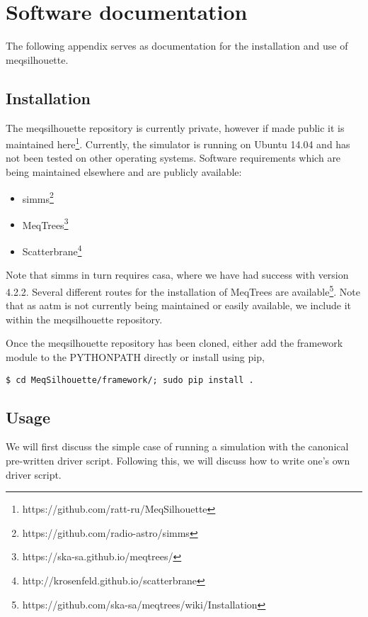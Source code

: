\chapter{Software documentation}
The following appendix serves as documentation for the installation and use of {\sc meqsilhouette}.

\section{Installation}

The {\sc meqsilhouette} repository is currently private, however if made public it is maintained here\footnote{https://github.com/ratt-ru/MeqSilhouette}. Currently, the simulator is running on {\sc Ubuntu 14.04} and has not been tested on other operating systems. Software requirements which are being maintained elsewhere and are publicly available: 
\begin{itemize}
 \item {\sc simms}\footnote{https://github.com/radio-astro/simms}
 \item {\sc MeqTrees}\footnote{https://ska-sa.github.io/meqtrees/} 
 \item {\sc Scatterbrane}\footnote{http://krosenfeld.github.io/scatterbrane}
\end{itemize}

Note that {\sc simms} in turn requires {\sc casa}, where we have had success with version 4.2.2. Several different routes for the installation of {\sc MeqTrees} are available\footnote{https://github.com/ska-sa/meqtrees/wiki/Installation}. Note that as {\sc aatm} is not currently being maintained or easily available, we include it within the {\sc meqsilhouette} repository.


Once the {\sc meqsilhouette} repository has been cloned, either add the framework module to the PYTHONPATH directly or install using pip,
\begin{verbatim}
$ cd MeqSilhouette/framework/; sudo pip install .
\end{verbatim}

\section{Usage}

We will first discuss the simple case of running a simulation with the canonical pre-written driver script. Following this, we will discuss how to write one's own driver script.

